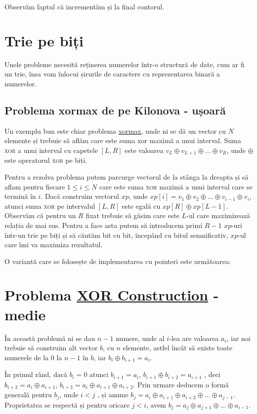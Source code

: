 Observăm faptul că incrementăm și la final contorul.

\section{Trie pe biți}
Unele probleme necesită reținerea numerelor într-o structură de date, cum ar fi un trie, însa vom înlocui șirurile de caractere cu reprezentarea binară a numerelor.

\subsection{Problema xormax de pe Kilonova - ușoară}
Un exemplu bun este chiar problema \href{https://kilonova.ro/problems/1984}{xormax}, unde ni se dă un vector cu $N$ elemente și trebuie să aflăm care este suma xor maximă a unui interval. Suma \textsc{xor} a unui interval cu capetele $[L, R]$ este valoarea  $v_L \oplus v_{L+1} \oplus \dots \oplus v_R$, unde $\oplus$ este operatorul \textsc{xor} pe biți.

Pentru a rezolva problema putem parcurge vectorul de la stânga la dreapta și să aflam pentru fiecare $1 \leq i \leq N$ care este suma \textsc{xor} maximă a unui interval care se termină în $i$. Dacă construim vectorul $xp$, unde $xp[i] = v_1 \oplus v_2 \oplus \dots \oplus v_{i-1} \oplus v_i$, atunci suma \textsc{xor} pe intervalul $[L, R]$ este egală cu $xp[R] \oplus xp[L-1]$. Observăm că pentru un $R$ fixat trebuie să găsim care este $L$-ul care maximizează relația de mai sus. Pentru a face asta putem să introducem primi $R-1$ $xp$-uri într-un trie pe biți și să căutăm bit cu bit, începând cu bitul semnificativ, $xp$-ul care îmi va maximiza rezultatul.

O variantă care se folosește de implementarea cu pointeri este următoarea:


\section{Problema \href{https://codeforces.com/contest/1895/problem/D}{XOR Construction} - medie}
În această problemă ni se dau $n-1$ numere, unde al $i$-lea are valoarea $a_i$, iar noi trebuie să construim alt vector $b$, cu $n$ elemente, astfel încât să existe toate numerele de la $0$ la $n-1$ în $b$, iar $b_i \oplus b_{i+1} = a_i$.

În primul rând, dacă $b_i = 0$ atunci $b_{i+1} = a_i$, $b_{i+1} \oplus b_{i+2} = a_{i+1}$ , deci $b_{i+2} = a_i \oplus a_{i+1}$, $b_{i+3} = a_i \oplus a_{i+1} \oplus a_{i+2}$. Prin urmare deducem o formă generală pentru $b_j$, unde $i < j$ , și anume $b_j = a_i \oplus a_{i+1} \oplus a_{i+2} \oplus \dots \oplus a_{j-1}$. Proprietatea se respectă și pentru oricare $j < i$, avem $b_j = a_j \oplus a_{j+1} \oplus \dots \oplus a_{i-1}$.

